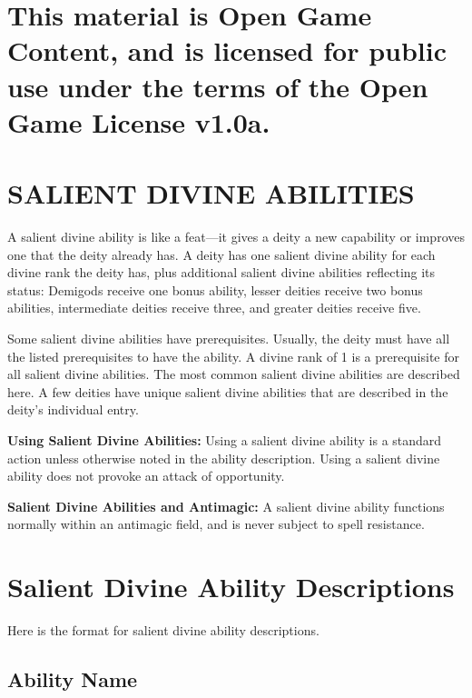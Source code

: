 \documentclass{article}
\begin{document}
\section*{This material is Open Game Content, and is licensed for public use under 
the terms of the Open Game License v1.0a.}

\section*{{\LARGE{}SALIENT DIVINE ABILITIES}}

\vspace{12pt}
A salient divine ability is like a feat---it gives a deity a new capability or 
improves one that the deity already has. A deity has one salient divine ability 
for each divine rank the deity has, plus additional salient divine abilities reflecting 
its status: Demigods receive one bonus ability, lesser deities receive two bonus 
abilities, intermediate deities receive three, and greater deities receive five. 

Some salient divine abilities have prerequisites. Usually, the deity must have 
all the listed prerequisites to have the ability. A divine rank of 1 is a prerequisite 
for all salient divine abilities. The most common salient divine abilities are 
described here. A few deities have unique salient divine abilities that are described 
in the deity's individual entry.

\vspace{12pt}
\textbf{Using Salient Divine Abilities:} Using a salient divine ability is a standard 
action unless otherwise noted in the ability description. Using a salient divine 
ability does not provoke an attack of opportunity.

\vspace{12pt}
\textbf{Salient Divine Abilities and Antimagic: }A salient divine ability functions 
normally within an antimagic field, and is never subject to spell resistance.

\vspace{12pt}
\section*{Salient Divine Ability Descriptions}

Here is the format for salient divine ability descriptions.

\vspace{12pt}
\subsection*{Ability Name}
\end{document}
